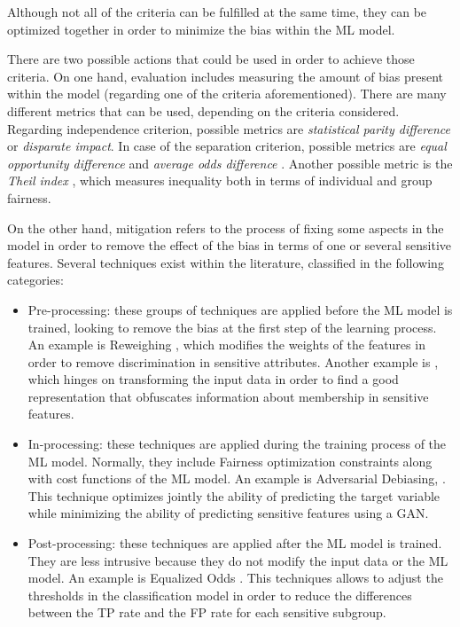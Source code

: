 \documentclass[final]{elsarticle}
\begin{document}
Although not all of the criteria can be fulfilled at the same time, they can be optimized together in order to minimize the bias within the ML model.

There are two possible actions that could be used in order to achieve those criteria. On one hand, evaluation includes measuring the amount of bias present within the model (regarding one of the criteria aforementioned). There are many different metrics that can be used, depending on the criteria considered. Regarding independence criterion, possible metrics are \textit{statistical parity difference} or \textit{disparate impact}. In case of the separation criterion, possible metrics are \textit{equal opportunity difference} and \textit{average odds difference} \cite{hardt2016equality}. Another possible metric is the \textit{Theil index} \cite{speicher2018unified}, which measures inequality both in terms of individual and group fairness. 

On the other hand, mitigation refers to the process of fixing some aspects in the model in order to remove the effect of the bias in terms of one or several sensitive features. Several techniques exist within the literature, classified in the following categories:  
    \begin{itemize}[leftmargin=*]
    \item Pre-processing: these groups of techniques are applied before the ML model is trained, looking to remove the bias at the first step of the learning process. An example is Reweighing \cite{kamiran2012data}, which modifies the weights of the features in order to remove discrimination in sensitive attributes. Another example is \cite{zemel2013learning}, which hinges on transforming the input data in order to find a good representation that obfuscates information about membership in sensitive features.
    
    \item In-processing: these techniques are applied during the training process of the ML model. Normally, they include Fairness optimization constraints along with cost functions of the ML model. An example is Adversarial Debiasing, \cite{zhang2018mitigating}. This technique optimizes jointly the ability of predicting the target variable while minimizing the ability of predicting sensitive features using a GAN.
    
    \item Post-processing: these techniques are applied after the ML model is trained. They are less intrusive because they do not modify the input data or the ML model. An example is Equalized Odds \cite{hardt2016equality}. This techniques allows to adjust the thresholds in the classification model in order to reduce the differences between the TP rate and the FP rate for each sensitive subgroup.
    \end{itemize}
\end{document}
